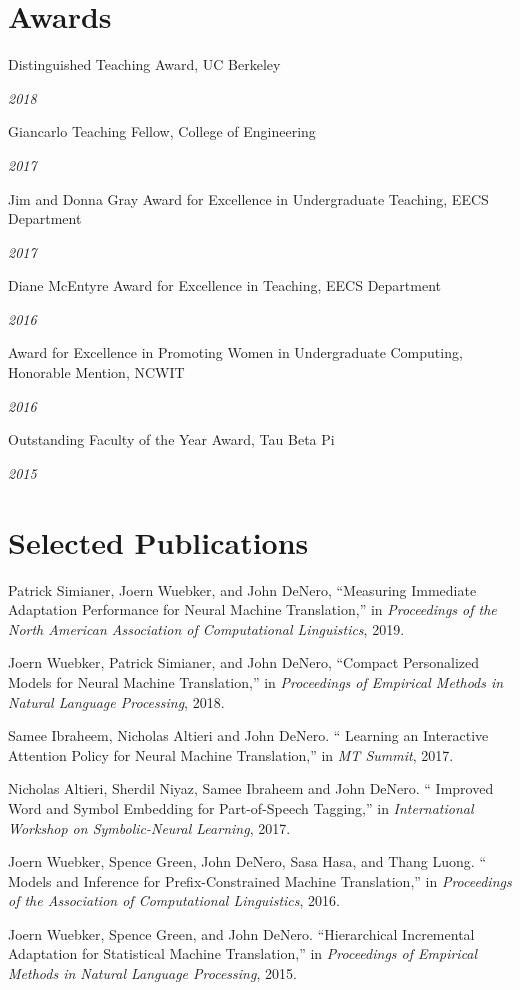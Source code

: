 \documentclass[margin,line]{res}
\newcommand{\dated}[2]{\parbox[t]{4.4in}{#1} \hspace{0.4in}
											 \parbox[t]{1in}{ {\it #2 } } }
\begin{document}
\begin{resume}
\section{\sc Awards}

\dated{Distinguished Teaching Award, UC Berkeley} { 2018 }

\dated{Giancarlo Teaching Fellow, College of Engineering} { 2017 }

\dated{Jim and Donna Gray Award for Excellence in Undergraduate Teaching, EECS Department} { 2017 }

\dated{Diane McEntyre Award for Excellence in Teaching, EECS Department} { 2016 }

\dated{Award for Excellence in Promoting Women in Undergraduate Computing, Honorable Mention, NCWIT} { 2016 }

\dated{Outstanding Faculty of the Year Award, Tau Beta Pi} { 2015 }

\section{\sc Selected Publications}

\small

Patrick Simianer, Joern Wuebker, and John DeNero, ``Measuring Immediate Adaptation Performance for Neural Machine Translation,'' in {\it Proceedings of the North American Association of Computational Linguistics}, 2019.

Joern Wuebker, Patrick Simianer, and John DeNero, ``Compact Personalized Models for Neural Machine Translation,'' in {\it Proceedings of Empirical Methods in Natural Language Processing}, 2018.

Samee Ibraheem, Nicholas Altieri and John DeNero. `` Learning an Interactive Attention Policy for Neural Machine Translation,'' in {\it MT Summit}, 2017.

Nicholas Altieri, Sherdil Niyaz, Samee Ibraheem and John DeNero. `` Improved Word and Symbol Embedding for Part-of-Speech Tagging,'' in {\it International Workshop on Symbolic-Neural Learning}, 2017.

Joern Wuebker, Spence Green, John DeNero, Sasa Hasa, and Thang Luong. `` Models and Inference for Prefix-Constrained Machine Translation,'' in {\it Proceedings of the Association of Computational Linguistics}, 2016.

Joern Wuebker, Spence Green, and John DeNero. ``Hierarchical Incremental Adaptation for Statistical Machine Translation,'' in {\it Proceedings of Empirical Methods in Natural Language Processing}, 2015.


\end{resume}
\end{document}
